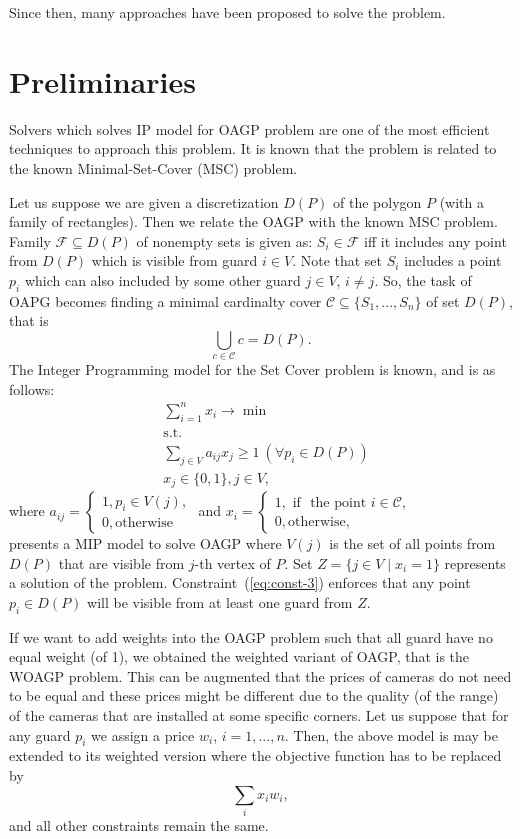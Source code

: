 \documentclass[runningheads,a4paper]{llncs}
\begin{document}
     Since then, many approaches have been proposed to solve the problem.
     \section{Preliminaries}
     Solvers which solves IP model for OAGP problem are one of the most efficient techniques to approach this problem. It is known that the problem is related to the known Minimal-Set-Cover (MSC) problem.

     Let us suppose we are given a discretization $D(P)$ of the polygon $P$ (with a family of rectangles). Then we relate the OAGP with the known MSC problem.
     Family $\mathcal{F}\subseteq D(P)$ of nonempty sets is given as: $S_i \in \mathcal{F}$ iff it includes any point from $D(P)$ which is visible from guard $i\in V$. Note that set $S_i$ includes a point $p_i$ which can also included by some other guard $j\in V$, $i \neq j$. So, the task of OAPG becomes finding a minimal cardinalty cover $\mathcal{C}\subseteq\{S_1,...,S_n\}$ of set $D(P)$, that is
     $$ \bigcup_{c \in \mathcal{C}} c = D(P).$$ The Integer Programming model for the Set Cover problem is known, and is as follows:
     \begin{align}
        &\sum_{i=1}^n x_i \longrightarrow \min \\
        &\mbox{s.t.} \\
        &\sum_{j\in V} a_{ij}x_j \geq 1\ (\forall p_i\in D(P)) \label{eq:const-3}\\
        & x_j \in \{0,1\}, j \in V,
     \end{align}
     where
     $a_{ij} = \begin{cases}
          1, p_i \in V(j), \\
          0, \mbox{otherwise}
     \end{cases}$
     and $x_i = \begin{cases}
     	 1, \mbox{ if } \mbox{ the point } i \in \mathcal{C},\\
     	 0, \mbox{otherwise},
     \end{cases}$ \\
      presents a MIP model to solve OAGP where $V(j)$ is the set of all points from $D(P)$ that are visible from $j$-th vertex of $P$.
     Set $Z = \{j \in V\mid x_i=1\}$ represents a solution of the problem.
     Constraint~(\ref{eq:const-3}) enforces that any point $p_i \in D(P)$ will be visible from at least one guard from $Z$.

     If we want to add weights into the OAGP problem such that all guard have no equal weight (of 1), we obtained the weighted variant of OAGP, that is the WOAGP problem. This can be augmented that the prices of cameras do not need to be equal and these prices might be different due to the quality (of the range) of the cameras that are installed at some specific corners.  Let us suppose that for any guard $p_i$ we assign a price $w_i$, $i=1,...,n$. Then, the above model is may be extended to its weighted version where the objective function has to be replaced by
     $$ \sum_{i} x_i w_i,$$
      and all other constraints remain the same.
\end{document}
